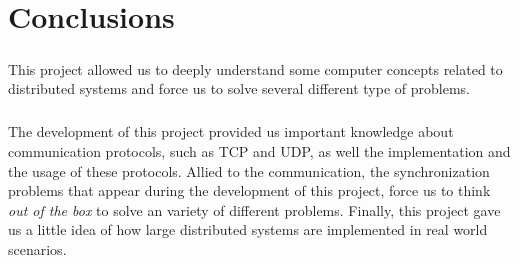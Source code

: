 \documentclass{report}
\begin{document}
	\chapter{Conclusions}
	
	        \paragraph{}This project allowed us to deeply understand some computer concepts
			related to distributed systems and force us to solve several different type of 
			problems. 
	        
	        \paragraph{} The development of this project provided us important knowledge
			about communication protocols, such as TCP and UDP, as well the implementation and
			the usage of these protocols. Allied to the communication, the synchronization 
			problems that appear during the development of this project, force us to think 
			\emph{out of the box} to solve an variety of different problems. Finally, this 
			project gave us a little idea of how large distributed systems are implemented
			in real world scenarios. 
\end{document}
